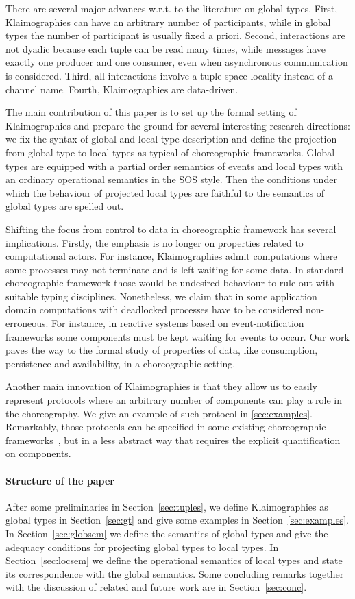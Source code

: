 There are several major advances w.r.t. to the literature on global types.
First, Klaimographies can have an arbitrary number of participants, while in global types the number of participant is usually fixed a priori.
Second, interactions are not dyadic because each tuple can be read many times, while messages have exactly one producer and one consumer, even when asynchronous communication is considered.
Third, all interactions involve a tuple space locality instead of a channel name.
Fourth, Klaimographies are data-driven.

The main contribution of this paper is to set up the formal setting of Klaimographies and prepare the ground for several interesting research directions: we fix the syntax of global and local type description and define the projection from global type to local types as typical of choreographic frameworks.
Global types are equipped with a partial order semantics of events and local types with an ordinary operational semantics in the SOS style. Then the conditions under which the behaviour of projected local types are faithful to the semantics of global types are spelled out. 

Shifting the focus from control to data in choreographic framework has
several implications.
%
Firstly, the emphasis is no longer on properties related to
computational actors.
%
For instance, Klaimographies admit computations where some processes
may not terminate and is left waiting for some data.
%
In standard choreographic framework those would be undesired behaviour
to rule out with suitable typing disciplines.
%
Nonetheless, we claim that in some application domain computations with
deadlocked processes have to be considered non-erroneous.
%
For instance, in reactive systems based on event-notification
frameworks some  components must be kept waiting for
events to occur.
%
Our work paves the way to the formal study of properties of data, like consumption, persistence and availability, in a choreographic setting.

Another main innovation of Klaimographies is that they allow us to easily
represent protocols where an arbitrary number of components can
play a role in the choreography.
%
We give an example of such protocol in \cref{sec:examples}.
%
Remarkably, those protocols can be specified in some existing
choreographic frameworks~\cite{ydbh10,chjny19}, but in a less abstract way
that requires the explicit quantification on components.

\paragraph{Structure of the paper}
After some preliminaries in Section~\ref{sec:tuples}, we define Klaimographies as global types in Section~\ref{sec:gt} and give some examples in Section~\ref{sec:examples}.
In Section~\ref{sec:globsem} we define the semantics of global types and give the adequacy conditions for projecting global types to local types.
In Section~\ref{sec:locsem} we define the operational semantics of local types and state its correspondence with the global semantics.
Some concluding remarks together with the discussion of related and future work are in Section~\ref{sec:conc}.


